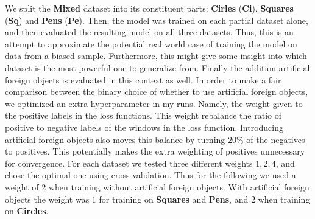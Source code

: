 We split the \textbf{Mixed} dataset into its constituent parts: \textbf{Cirles} (\textbf{Ci}), \textbf{Squares} (\textbf{Sq}) and \textbf{Pens} (\textbf{Pe}).
Then, the model was trained on each partial dataset alone, and then evaluated the resulting model on all three datasets.
Thus, this is an attempt to approximate the potential real world case of training the model on data from a biased sample.
Furthermore, this might give some insight into which dataset is the most powerful one to generalize from.
Finally the addition artificial foreign objects is evaluated in this context as well.
In order to make a fair comparison between the binary choice of whether to use artificial foreign objects, we optimized an extra hyperparameter in my runs. 
Namely, the weight given to the positive labels in the loss functions. 
This weight rebalance the ratio of positive to negative labels of the windows in the loss function.
Introducing artificial foreign objects also moves this balance by turning $20\%$ of the negatives to positives.
This potentially makes the extra weighting of positives unnecessary for convergence. 
For each dataset we tested three different weights $1,2,4$, and chose the optimal one using cross-validation.
Thus for the following we used a weight of $2$ when training without artificial foreign objects. With artificial foreign objects the weight was $1$ for training on \textbf{Squares} and \textbf{Pens}, and $2$ when training on \textbf{Circles}. 

